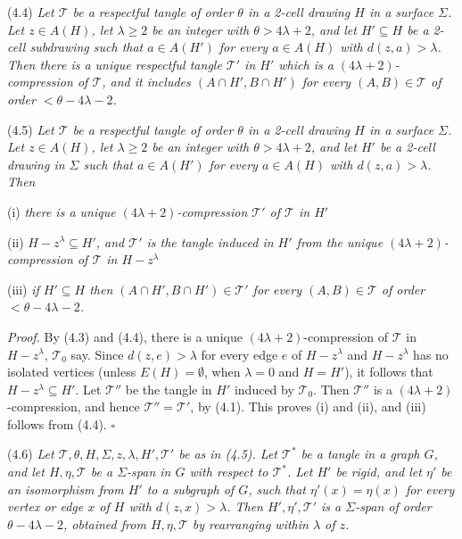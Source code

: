 \stmt
(4.4) \textit{Let $\mathcal{T}$ be a respectful tangle of order $\theta$ in a 2-cell drawing $H$ in a surface $\Sigma$. Let $z \in A(H)$, let $\lambda \ge 2$ be an integer with $\theta > 4\lambda + 2$, and let $H' \subseteq H$ be a 2-cell subdrawing such that $a \in A(H')$ for every $a \in A(H)$ with $d(z, a) > \lambda$. Then there is a unique respectful tangle $\mathcal{T}'$ in $H'$ which is a $(4\lambda + 2)$-compression of $\mathcal{T}$, and it includes $(A \cap H', B \cap H')$ for every $(A, B) \in \mathcal{T}$ of order $< \theta - 4\lambda - 2$.}

\stmt
(4.5) \textit{Let $\mathcal{T}$ be a respectful tangle of order $\theta$ in a 2-cell drawing $H$ in a surface $\Sigma$. Let $z \in A(H)$, let $\lambda \ge 2$ be an integer with $\theta > 4\lambda + 2$, and let $H'$ be a 2-cell drawing in $\Sigma$ such that $a \in A(H')$ for every $a \in A(H)$ with $d(z, a) > \lambda$. Then}

\hspace*{12pt}(i) \textit{there is a unique $(4\lambda + 2)$-compression $\mathcal{T}'$ of $\mathcal{T}$ in $H'$}

\hspace*{12pt}(ii) \textit{$H - z^\lambda \subseteq H'$, and $\mathcal{T}'$ is the tangle induced in $H'$ from the unique $(4\lambda + 2)$-compression of $\mathcal{T}$ in $H - z^\lambda$}

\hspace*{12pt}(iii) \textit{if $H' \subseteq H$ then $(A \cap H', B \cap H') \in \mathcal{T}'$ for every $(A, B) \in \mathcal{T}$ of order $< \theta - 4\lambda - 2$.}

\textit{Proof.} By (4.3) and (4.4), there is a unique $(4\lambda + 2)$-compression of $\mathcal{T}$ in $H - z^\lambda$, $\mathcal{T}_0$ say. Since $d(z, e) > \lambda$ for every edge $e$ of $H - z^\lambda$ and $H - z^\lambda$ has no isolated vertices (unless $E(H) = \emptyset$, when $\lambda = 0$ and $H = H'$), it follows that $H - z^\lambda \subseteq H'$. Let $\mathcal{T}''$ be the tangle in $H'$ induced by $\mathcal{T}_0$. Then $\mathcal{T}''$ is a $(4\lambda + 2)$-compression, and hence $\mathcal{T}'' = \mathcal{T}'$, by (4.1). This proves (i) and (ii), and (iii) follows from (4.4). $\square$

\stmt
(4.6) \textit{Let $\mathcal{T}, \theta, H, \Sigma, z, \lambda, H', \mathcal{T}'$ be as in (4.5). Let $\mathcal{T}^*$ be a tangle in a graph $G$, and let $H, \eta, \mathcal{T}$ be a $\Sigma$-span in $G$ with respect to $\mathcal{T}^*$. Let $H'$ be rigid, and let $\eta'$ be an isomorphism from $H'$ to a subgraph of $G$, such that $\eta'(x) = \eta(x)$ for every vertex or edge $x$ of $H$ with $d(z, x) > \lambda$. Then $H', \eta', \mathcal{T}'$ is a $\Sigma$-span of order $\theta - 4\lambda - 2$, obtained from $H, \eta, \mathcal{T}$ by rearranging within $\lambda$ of $z$.}

